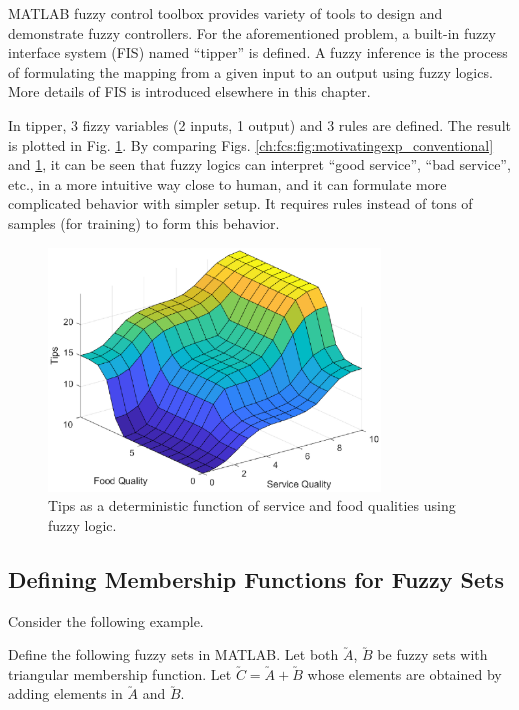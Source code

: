 MATLAB fuzzy control toolbox provides variety of tools to design and demonstrate fuzzy controllers. For the aforementioned problem, a built-in fuzzy interface system (FIS) named ``tipper'' is defined. A fuzzy inference is the process of formulating the mapping from a given input to an output using fuzzy logics. More details of FIS is introduced elsewhere in this chapter.

In tipper, 3 fizzy variables (2 inputs, 1 output) and 3 rules are defined. The result is plotted in Fig. \ref{ch:fcs:fig:motivatingexp_fis}. By comparing Figs. \ref{ch:fcs:fig:motivatingexp_conventional} and \ref{ch:fcs:fig:motivatingexp_fis}, it can be seen that fuzzy logics can interpret ``good service'', ``bad service'', etc., in a more intuitive way close to human, and it can formulate more complicated behavior with simpler setup. It requires rules instead of tons of samples (for training) to form this behavior.

\begin{figure}
	\centering
	\includegraphics[width=250pt]{chapters/ch-fuzzy-control-system/figures/motivatingexp_fis.eps}
	\caption{Tips as a deterministic function of service and food qualities using fuzzy logic.} \label{ch:fcs:fig:motivatingexp_fis}
\end{figure}

\subsection{Defining Membership Functions for Fuzzy Sets}

Consider the following example.

\begin{shortbox}
	
	Define the following fuzzy sets in MATLAB. Let both $\utilde{A}$, $\utilde{B}$ be fuzzy sets with triangular membership function. Let $\utilde{C} = \utilde{A} + \utilde{B}$ whose elements are obtained by adding elements in $\utilde{A}$ and $\utilde{B}$.
	
\end{shortbox}


